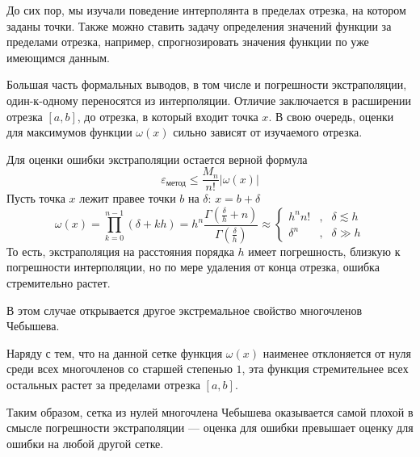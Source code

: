 \documentclass[professionalfonts,compress,unicode]{beamer}
\begin{document}
{
	До сих пор, мы изучали поведение интерполянта в пределах отрезка, на котором заданы точки.
	Также можно ставить задачу определения значений функции за пределами отрезка, например, 
	спрогнозировать значения функции по уже имеющимся данным.
	\pause
	
	Большая часть формальных выводов, в том числе и погрешности экстраполяции, 
	один-к-одному переносятся из интерполяции. Отличие заключается в расширении отрезка $[a,b]$,
	до отрезка, в который входит точка $x$. В свою очередь, оценки для максимумов функции $\omega(x)$
	сильно зависят от изучаемого отрезка.
}

{
	Для оценки ошибки экстраполяции остается верной формула
	$$
	\varepsilon_{\text{метод}} \leq \frac{M_n}{n!} |\omega(x)|
	$$
	Пусть точка $x$ лежит правее точки $b$ на $\delta$: $x = b + \delta$
	$$
	\omega(x) = \prod_{k=0}^{n-1} \left(\delta+kh\right) = h^n\frac{\Gamma\left(\frac{\delta}{h}+n\right)}{\Gamma\left(\frac{\delta}{h}\right)}
	\approx 
	\left\{
	\begin{array}{lcl}
		h^n n!&,& \delta \lesssim h\\
		\delta^n&,& \delta \gg h
	\end{array}
	\right.
	$$
	То есть, экстраполяция на расстояния порядка $h$ имеет погрешность, близкую к погрешности интерполяции,
	но по мере удаления от конца отрезка, ошибка стремительно растет.
}

{
	В этом случае открывается другое экстремальное свойство многочленов Чебышева.
	\pause
	
	Наряду с тем, что на данной сетке функция $\omega(x)$ наименее отклоняется от нуля 
	среди всех многочленов со старшей степенью $1$, эта функция стремительнее всех остальных
	растет за пределами отрезка $[a,b]$. 
	\pause
	
	Таким образом, сетка из нулей многочлена Чебышева оказывается самой плохой
	в смысле погрешности экстраполяции --- оценка для ошибки превышает оценку для ошибки на любой другой сетке.
}
\end{document}
